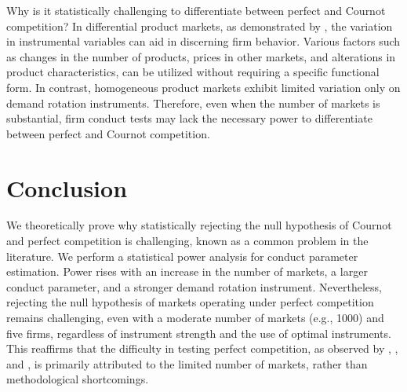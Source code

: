 \documentclass[11pt, a4paper]{article}
\begin{document}

Why is it statistically challenging to differentiate between perfect and Cournot competition?
In differential product markets, as demonstrated by \citet{berry2014identification}, the variation in instrumental variables can aid in discerning firm behavior. 
Various factors such as changes in the number of products, prices in other markets, and alterations in product characteristics, can be utilized without requiring a specific functional form.
In contrast, homogeneous product markets exhibit limited variation only on demand rotation instruments. 
Therefore, even when the number of markets is substantial, firm conduct tests may lack the necessary power to differentiate between perfect and Cournot competition.


\section{Conclusion}
We theoretically prove why statistically rejecting the null hypothesis of Cournot and perfect competition is challenging, known as a common problem in the literature. 
We perform a statistical power analysis for conduct parameter estimation. Power rises with an increase in the number of markets, a larger conduct parameter, and a stronger demand rotation instrument. 
Nevertheless, rejecting the null hypothesis of markets operating under perfect competition remains challenging, even with a moderate number of markets (e.g., 1000) and five firms, regardless of instrument strength and the use of optimal instruments. 
This reaffirms that the difficulty in testing perfect competition, as observed by \cite{genesove1998testing}, \cite{steen1999testing}, and \cite{shaffer1993test}, is primarily attributed to the limited number of markets, rather than methodological shortcomings.
\end{document}
